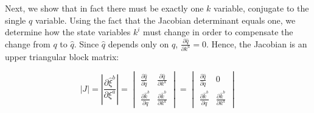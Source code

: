 \documentclass[letterpaper]{article}
\begin{document}

Next, we show that in fact there must be exactly one $k$ variable, conjugate to the single $q$ variable. Using the fact that the Jacobian determinant equals one, we determine how the state variables $k^i$ must change in order to compensate the change from $q$ to $\hat q$. Since $\hat{q}$ depends only on $q$, $\frac{\partial \hat{q}}{\partial k^a} = 0$. Hence, the Jacobian is an upper triangular block matrix: 



\begin{equation}
|J| = \left|\frac{\partial \hat{\xi}^b}{\partial \xi^a} \right| = \begin{vmatrix}
\frac{\partial \hat{q}}{\partial q} & \frac{\partial \hat{q}}{\partial k^a} \\
\frac{\partial \hat{k}^b}{\partial q} & \frac{\partial \hat{k}^b}{\partial  k^a} 
\end{vmatrix} = \begin{vmatrix}
\frac{\partial \hat{q}}{\partial q} & 0 \\
\frac{\partial \hat{k}^b}{\partial q} & \frac{\partial \hat{k}^b}{\partial  k^a}
\end{vmatrix}
\end{equation}
\end{document}
